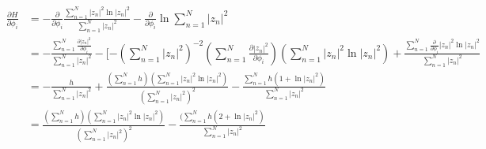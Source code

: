 \begin{equation}\label{eq:dH/dphi}
\begin{split}
\frac{\partial H}{\partial \phi_{i}} & = -\frac{\partial}{\partial \phi_{i}}\frac{\sum_{n=1}^{N} \left|z_{n}\right|^2\ln{\left|z_{n}\right|}^2}{\sum_{n=1}^{N} {\left|z_{n}\right|}^{2}}-\frac{\partial}{\partial \phi_{i}}\ln{\sum_{n=1}^{N} {\left|z_{n}\right|}^{2}} \\
& =-\frac{\sum_{n=1}^{N} \frac{\partial {\left|z_{n}\right|}^{2}}{\partial \phi_{i}}}{\sum_{n=1}^{N} {\left|z_{n}\right|}^{2}}-[-(\sum_{n=1}^{N} {\left|z_{n}\right|}^{2})^{-2}(\sum_{n=1}^{N} \frac{\partial {\left|z_{n}\right|}^{2}}{\partial \phi_{i}})(\sum_{n=1}^{N} \left|z_{n}\right|^2\ln{\left|z_{n}\right|}^2)+\frac{\sum_{n=1}^{N} \frac{\partial}{\partial \phi_{i}}\left|z_{n}\right|^2\ln{\left|z_{n}\right|}^2}{\sum_{n=1}^{N} {\left|z_{n}\right|}^{2}} \\
& =-\frac{h}{\sum_{n=1}^{N} {\left|z_{n}\right|}^{2}}+\frac{(\sum_{n=1}^{N} h)(\sum_{n=1}^{N} \left|z_{n}\right|^2\ln{\left|z_{n}\right|}^2)}{(\sum_{n=1}^{N} {\left|z_{n}\right|}^{2})^2}-\frac{\sum_{n=1}^{N} h(1+\ln{\left|z_{n}\right|}^2)}{\sum_{n=1}^{N} {\left|z_{n}\right|}^{2}}\\
& =\frac{(\sum_{n=1}^{N} h)(\sum_{n=1}^{N} {\left|z_{n}\right|}^{2}\ln{\left|z_{n}\right|}^{2})}{(\sum_{n=1}^{N} {\left|z_{n}\right|}^{2})^{2}} - \frac{(\sum_{n=1}^{N} h(2+\ln{\left|z_{n}\right|}^{2})}{\sum_{n=1}^{N} {\left|z_{n}\right|}^{2}}
\end{split}
\end{equation}
